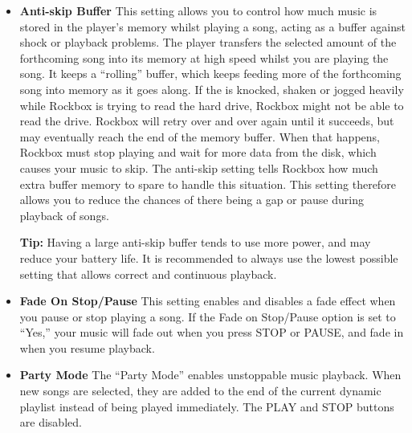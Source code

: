 \begin{itemize}
\begin{itemize}
  \item \textbf{Anti-skip Buffer}
    This setting allows you to control how much music is stored in the player's memory whilst playing a song, acting as a buffer against shock or playback problems.  The player transfers the selected amount of the forthcoming song into its memory at high speed whilst you are playing the song. It keeps a ``rolling'' buffer, which keeps feeding more of the forthcoming song into memory as it goes along. If the \dap is knocked, shaken or jogged heavily while Rockbox is trying to read the hard drive, Rockbox might not be able to read the drive.  Rockbox will retry over and over again until it succeeds, but may eventually reach the end of the memory buffer.  When that happens, Rockbox must stop playing and wait for more data from the disk, which causes your music to skip.  The anti-skip setting tells Rockbox how much extra buffer memory to spare to handle this situation.  This setting therefore allows you to reduce the chances of there being a gap or pause during playback of songs.
    
    
    \textbf{Tip:  }Having a large anti-skip buffer tends to use more power, and may reduce your battery life. It is recommended to always use the lowest possible setting that allows correct and continuous playback.
    
  \item \textbf{Fade On Stop/Pause}
    This setting enables and disables a fade effect when you pause or stop playing a song.  If the Fade on Stop/Pause option is set to ``Yes,'' your music will fade out when you press STOP or PAUSE, and fade in when you resume playback.
    
  \item \textbf{Party Mode}
    The ``Party Mode'' enables unstoppable music playback.  When new songs are selected, they are added to the end of the current dynamic playlist instead of being played immediately.  The PLAY and STOP buttons are disabled.
    

\end{itemize}
\end{itemize}

